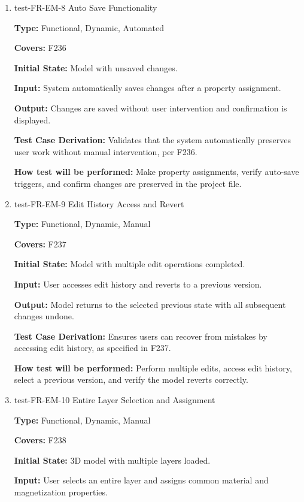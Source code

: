 \documentclass[12pt, titlepage]{article}
\begin{document}
\begin{enumerate}
\item{test-FR-EM-8 Auto Save Functionality\\}

\textbf{Type:} Functional, Dynamic, Automated

\textbf{Covers:} F236
					
\textbf{Initial State:} Model with unsaved changes.
					
\textbf{Input:} System automatically saves changes after a property assignment.
					
\textbf{Output:} Changes are saved without user intervention and confirmation is displayed.

\textbf{Test Case Derivation:} Validates that the system automatically preserves user work without manual intervention, per F236.
					
\textbf{How test will be performed:} Make property assignments, verify auto-save triggers, and confirm changes are preserved in the project file.

\item{test-FR-EM-9 Edit History Access and Revert\\}

\textbf{Type:} Functional, Dynamic, Manual

\textbf{Covers:} F237
					
\textbf{Initial State:} Model with multiple edit operations completed.
					
\textbf{Input:} User accesses edit history and reverts to a previous version.
					
\textbf{Output:} Model returns to the selected previous state with all subsequent changes undone.

\textbf{Test Case Derivation:} Ensures users can recover from mistakes by accessing edit history, as specified in F237.
					
\textbf{How test will be performed:} Perform multiple edits, access edit history, select a previous version, and verify the model reverts correctly.

\item{test-FR-EM-10 Entire Layer Selection and Assignment\\}

\textbf{Type:} Functional, Dynamic, Manual

\textbf{Covers:} F238
					
\textbf{Initial State:} 3D model with multiple layers loaded.
					
\textbf{Input:} User selects an entire layer and assigns common material and magnetization properties.
					

\end{enumerate}
\end{document}
